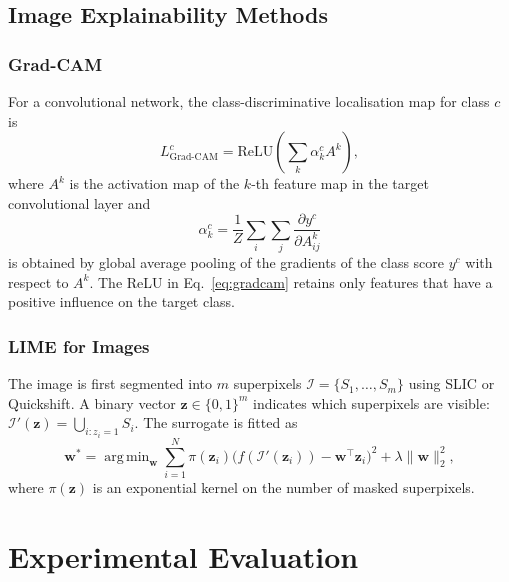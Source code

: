 \documentclass[conference]{IEEEtran}
\newcommand{\bw}{\mathbf{w}}
\DeclareMathOperator*{\argmin}{arg\,min}
\begin{document}
\subsection{Image Explainability Methods}

\subsubsection{Grad-CAM}

For a convolutional network, the class-discriminative localisation map for
class $c$ is
\begin{equation}
L^c_\text{Grad-CAM} = \text{ReLU}\!\left(\sum_k \alpha_k^c A^k\right),
\label{eq:gradcam}
\end{equation}
where $A^k$ is the activation map of the $k$-th feature map in the target
convolutional layer and
\begin{equation}
\alpha_k^c = \frac{1}{Z}\sum_i\sum_j
  \frac{\partial y^c}{\partial A^k_{ij}}
\label{eq:gradcam_weights}
\end{equation}
is obtained by global average pooling of the gradients of the class score $y^c$
with respect to $A^k$. The ReLU in Eq.~\eqref{eq:gradcam} retains only
features that have a positive influence on the target class.

\subsubsection{LIME for Images}

The image is first segmented into $m$ superpixels
$\mathcal{I} = \{S_1,\ldots,S_m\}$ using SLIC or Quickshift. A binary vector
$\mathbf{z}\in\{0,1\}^m$ indicates which superpixels are visible:
$\mathcal{I}'(\mathbf{z})=\bigcup_{i:z_i=1}S_i$. The surrogate is fitted as
\begin{equation}
\bw^* = \argmin_{\bw}\sum_{i=1}^{N}\pi(\mathbf{z}_i)
  \bigl(f(\mathcal{I}'(\mathbf{z}_i)) - \bw^\top\mathbf{z}_i\bigr)^2
  + \lambda\|\bw\|_2^2,
\label{eq:lime_image}
\end{equation}
where $\pi(\mathbf{z})$ is an exponential kernel on the number of masked
superpixels.

\section{Experimental Evaluation}
\label{sec:experiments}
\end{document}
